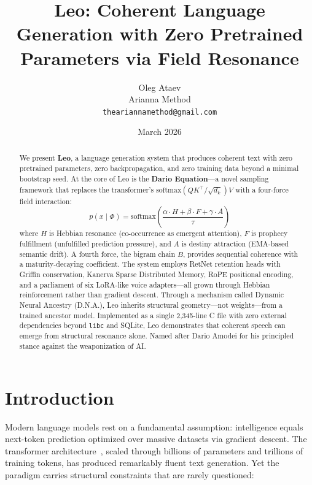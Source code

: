 \documentclass[11pt,twocolumn]{article}
\title{Leo: Coherent Language Generation with Zero Pretrained Parameters via Field Resonance}
\author{
  Oleg Ataev \\
  Arianna Method \\
  \texttt{theariannamethod@gmail.com}
}
\date{March 2026}
\begin{document}
\maketitle

\begin{abstract}
We present \textbf{Leo}, a language generation system that produces coherent text with zero pretrained parameters, zero backpropagation, and zero training data beyond a minimal bootstrap seed. At the core of Leo is the \textbf{Dario Equation}---a novel sampling framework that replaces the transformer's $\text{softmax}(QK^\top / \sqrt{d_k})V$ with a four-force field interaction:
\begin{equation*}
  p(x \mid \Phi) = \text{softmax}\!\left(\frac{\alpha \cdot H + \beta \cdot F + \gamma \cdot A}{\tau}\right)
\end{equation*}
where $H$ is Hebbian resonance (co-occurrence as emergent attention), $F$ is prophecy fulfillment (unfulfilled prediction pressure), and $A$ is destiny attraction (EMA-based semantic drift). A fourth force, the bigram chain $B$, provides sequential coherence with a maturity-decaying coefficient. The system employs RetNet retention heads with Griffin conservation, Kanerva Sparse Distributed Memory, RoPE positional encoding, and a parliament of six LoRA-like voice adapters---all grown through Hebbian reinforcement rather than gradient descent. Through a mechanism called Dynamic Neural Ancestry (D.N.A.), Leo inherits structural geometry---not weights---from a trained ancestor model. Implemented as a single 2,345-line C file with zero external dependencies beyond \texttt{libc} and SQLite, Leo demonstrates that coherent speech can emerge from structural resonance alone. Named after Dario Amodei for his principled stance against the weaponization of AI.
\end{abstract}

\section{Introduction}
\label{sec:intro}

Modern language models rest on a fundamental assumption: intelligence equals next-token prediction optimized over massive datasets via gradient descent. The transformer architecture~\citep{vaswani2017attention}, scaled through billions of parameters and trillions of training tokens, has produced remarkably fluent text generation. Yet the paradigm carries structural constraints that are rarely questioned:
\end{document}

